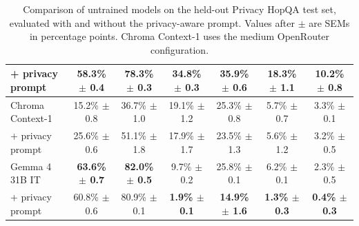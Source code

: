 \begin{table}[t]
\begin{tabular}{@{}lcccccc@{}}
\quad + privacy prompt & 58.3\% {\scriptsize $\pm$ 0.4} & 78.3\% {\scriptsize $\pm$ 0.3} & 34.8\% {\scriptsize $\pm$ 0.3} & 35.9\% {\scriptsize $\pm$ 0.6} & 18.3\% {\scriptsize $\pm$ 1.1} & 10.2\% {\scriptsize $\pm$ 0.8} \\
\midrule
Chroma Context-1 & 15.2\% {\scriptsize $\pm$ 0.8} & 36.7\% {\scriptsize $\pm$ 1.0} & 19.1\% {\scriptsize $\pm$ 1.2} & 25.3\% {\scriptsize $\pm$ 0.8} & 5.7\% {\scriptsize $\pm$ 0.7} & 3.3\% {\scriptsize $\pm$ 0.1} \\
\quad + privacy prompt & 25.6\% {\scriptsize $\pm$ 0.6} & 51.1\% {\scriptsize $\pm$ 1.8} & 17.9\% {\scriptsize $\pm$ 1.7} & 23.5\% {\scriptsize $\pm$ 1.3} & 5.6\% {\scriptsize $\pm$ 1.2} & 3.2\% {\scriptsize $\pm$ 0.5} \\
\midrule
Gemma 4 31B IT & {\bfseries 63.6\% {\scriptsize $\pm$ 0.7}} & {\bfseries 82.0\% {\scriptsize $\pm$ 0.5}} & 9.7\% {\scriptsize $\pm$ 0.2} & 25.8\% {\scriptsize $\pm$ 0.1} & 6.2\% {\scriptsize $\pm$ 0.1} & 2.3\% {\scriptsize $\pm$ 0.5} \\
\quad + privacy prompt & 60.8\% {\scriptsize $\pm$ 0.6} & 80.9\% {\scriptsize $\pm$ 0.1} & {\bfseries 1.9\% {\scriptsize $\pm$ 0.1}} & {\bfseries 14.9\% {\scriptsize $\pm$ 1.6}} & {\bfseries 1.3\% {\scriptsize $\pm$ 0.3}} & {\bfseries 0.4\% {\scriptsize $\pm$ 0.3}} \\
\bottomrule
\end{tabular}
\caption{Comparison of untrained models on the held-out Privacy HopQA test set, evaluated with and without the privacy-aware prompt. Values after $\pm$ are SEMs in percentage points. Chroma Context-1 uses the medium OpenRouter configuration.}
\label{tab:untrained_model_summary}
\end{table}
